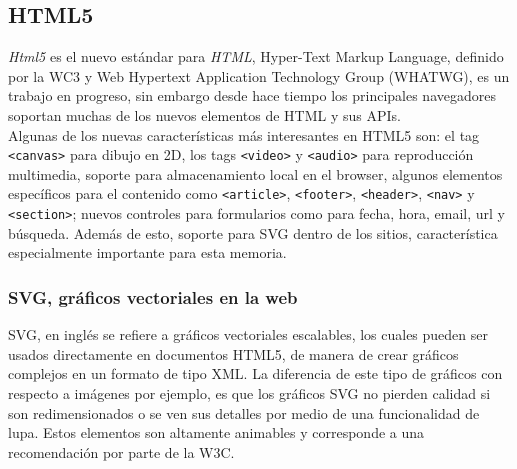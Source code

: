 \subsection{HTML5} %
\label{sub:html5}

\emph{Html5}\cite{html5} es el nuevo estándar para \emph{HTML}, Hyper-Text Markup Language, definido por la WC3\cite{w3c} y Web Hypertext Application Technology Group (WHATWG), es un trabajo en progreso, sin embargo desde hace tiempo los principales navegadores soportan muchas de los nuevos elementos de HTML y sus APIs.\\

Algunas de los nuevas características más interesantes en HTML5 son: el tag \texttt{<canvas>} para dibujo en 2D, los tags \texttt{<video>} y \texttt{<audio>} para reproducción multimedia, soporte para almacenamiento local en el browser, algunos elementos específicos para el contenido como \texttt{<article>}, \texttt{<footer>}, \texttt{<header>}, \texttt{<nav>} y \texttt{<section>}; nuevos controles para formularios como para fecha, hora, email, url y búsqueda. Además de esto, soporte para SVG dentro de los sitios, característica especialmente importante para esta memoria.

\subsubsection{SVG, gráficos vectoriales en la web} %
\label{ssub:svg_graficos_vectoriales_en_la_web}

SVG, en inglés se refiere a gráficos vectoriales escalables, los cuales pueden ser usados directamente en documentos HTML5, de manera de crear gráficos complejos en un formato de tipo XML. La diferencia de este tipo de gráficos con respecto a imágenes por ejemplo, es que los gráficos SVG no pierden calidad si son redimensionados o se ven sus detalles por medio de una funcionalidad de lupa. Estos elementos son altamente animables y corresponde a una recomendación por parte de la W3C\cite{w3c}.




